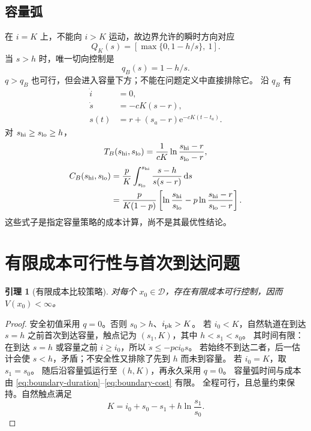 \documentclass[11pt,a4paper,UTF8]{ctexart}
\newtheorem{lemma}[theorem]{引理}
\theoremstyle{definition}
\newcommand{\Dcal}{\mathcal D}
\newcommand{\dd}{\,\mathrm d}
\newcommand{\e}{\mathrm e}
\begin{document}
\subsection{容量弧}
\label{sec:boundary-arc}
在 $i=K$ 上，不能向 $i>K$ 运动，故边界允许的瞬时方向对应
\begin{equation}
Q_K(s)=\left[\max\{0,1-h/s\},\ 1\right].
\label{eq:boundary-feasible}
\end{equation}
当 $s>h$ 时，唯一切向控制是
\begin{equation}
\boxed{q_B(s)=1-h/s.}
\label{eq:qB}
\end{equation}
$q>q_B$ 也可行，但会进入容量下方；不能在问题定义中直接排除它。
沿 $q_B$ 有
\begin{align}
\dot i&=0,\label{eq:boundary-i}\\
\dot s&=-cK(s-r),\label{eq:boundary-s}\\
s(t)&=r+(s_a-r)\e^{-cK(t-t_a)}.\label{eq:boundary-s-explicit}
\end{align}
对 $s_{\rm hi}\ge s_{\rm lo}\ge h$，
\begin{equation}
T_B(s_{\rm hi},s_{\rm lo})=\frac1{cK}\ln\frac{s_{\rm hi}-r}{s_{\rm lo}-r},
\label{eq:boundary-duration}
\end{equation}
\begin{align}
C_B(s_{\rm hi},s_{\rm lo})
&=\frac pK\int_{s_{\rm lo}}^{s_{\rm hi}}\frac{s-h}{s(s-r)}\dd s\notag\\
&=\frac{p}{K(1-p)}\left[\ln\frac{s_{\rm hi}}{s_{\rm lo}}
-p\ln\frac{s_{\rm hi}-r}{s_{\rm lo}-r}\right].
\label{eq:boundary-cost}
\end{align}
这些式子是指定容量策略的成本计算，尚不是其最优性结论。

\section{有限成本可行性与首次到达问题}
\label{sec:exit-time}
\begin{lemma}[有限成本比较策略]
\label{lem:finite-feasible}
对每个 $x_0\in\Dcal$，存在有限成本可行控制，因而 $V(x_0)<\infty$。
\end{lemma}
\begin{proof}
安全初值采用 $q=0$。否则 $s_0>h$、$i_{\rm pk}>K$。
若 $i_0<K$，自然轨道在到达 $s=h$ 之前首次到达容量，触点记为 $(s_1,K)$，其中 $h<s_1<s_0$。
其时间有限：在到达 $s=h$ 或容量之前 $i\ge i_0$，所以 $\dot s\le-pci_0s$。
若始终不到达二者，后一估计会使 $s<h$，矛盾；不安全性又排除了先到 $h$ 而未到容量。
若 $i_0=K$，取 $s_1=s_0$。
随后沿容量弧运行至 $(h,K)$，再永久采用 $q=0$。
容量弧时间与成本由 \eqref{eq:boundary-duration}--\eqref{eq:boundary-cost} 有限。
全程可行，且总量约束保持。自然触点满足
\begin{equation}
K=i_0+s_0-s_1+h\ln\frac{s_1}{s_0}.
\label{eq:s1}
\end{equation}
\end{proof}
\end{document}
